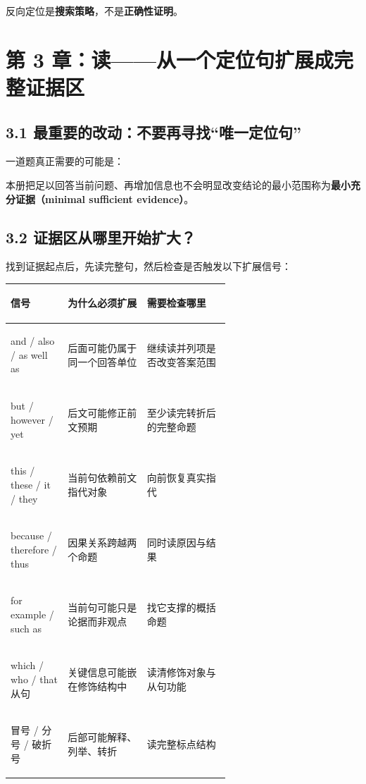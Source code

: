 \documentclass[11pt,a4paper]{ctexart}
\newcommand{\kw}[1]{\textbf{#1}}
\newcommand{\term}[2]{\textbf{#1（#2）}}
\begin{document}
反向定位是\kw{搜索策略}，不是\kw{正确性证明}。

\newpage
\section{第 3 章：读——从一个定位句扩展成完整证据区}

\subsection{3.1 最重要的改动：不要再寻找“唯一定位句”}
一道题真正需要的可能是：
\begin{center}
\end{center}
本册把足以回答当前问题、再增加信息也不会明显改变结论的最小范围称为\term{最小充分证据}{minimal sufficient evidence}。

\subsection{3.2 证据区从哪里开始扩大？}
找到证据起点后，先读完整句，然后检查是否触发以下扩展信号：

\begin{center}
\small
\begin{tabularx}{\linewidth}{>{\bfseries\raggedright\arraybackslash}p{0.26\linewidth} >{\raggedright\arraybackslash}p{0.36\linewidth} Y}
\toprule
信号 & 为什么必须扩展 & 需要检查哪里 \\
\midrule
and / also / as well as & 后面可能仍属于同一个回答单位 & 继续读并列项是否改变答案范围 \\
but / however / yet & 后文可能修正前文预期 & 至少读完转折后的完整命题 \\
this / these / it / they & 当前句依赖前文指代对象 & 向前恢复真实指代 \\
because / therefore / thus & 因果关系跨越两个命题 & 同时读原因与结果 \\
for example / such as & 当前句可能只是论据而非观点 & 找它支撑的概括命题 \\
which / who / that 从句 & 关键信息可能嵌在修饰结构中 & 读清修饰对象与从句功能 \\
冒号 / 分号 / 破折号 & 后部可能解释、列举、转折 & 读完整标点结构 \\
\bottomrule
\end{tabularx}
\end{center}
\end{document}
